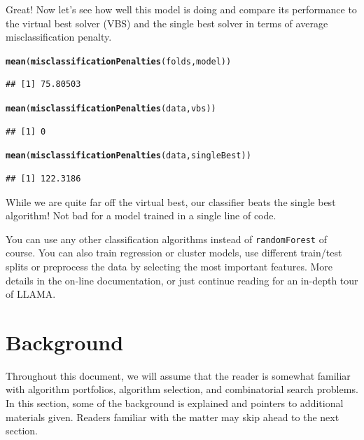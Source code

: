 \documentclass{article}\usepackage[]{graphicx}\usepackage[]{color}
\makeatletter
\newcommand{\hlstd}[1]{\textcolor[rgb]{0.345,0.345,0.345}{#1}}%
\newcommand{\hlkwd}[1]{\textcolor[rgb]{0.737,0.353,0.396}{\textbf{#1}}}%
\newenvironment{kframe}{%
 \def\at@end@of@kframe{}%
 \ifinner\ifhmode%
  \def\at@end@of@kframe{\end{minipage}}%
  \begin{minipage}{\columnwidth}%
 \fi\fi%
 \def\FrameCommand##1{\hskip\@totalleftmargin \hskip-\fboxsep
 \colorbox{shadecolor}{##1}\hskip-\fboxsep
     \hskip-\linewidth \hskip-\@totalleftmargin \hskip\columnwidth}%
 \MakeFramed {\advance\hsize-\width
   \@totalleftmargin\z@ \linewidth\hsize
   \@setminipage}}%
 {\par\unskip\endMakeFramed%
 \at@end@of@kframe}
\newenvironment{knitrout}{}{} %
\makeatother
\begin{document}
Great! Now let's see how well this model is doing and compare its performance to
the virtual best solver (VBS) and the single best solver in terms of average
misclassification penalty.

\begin{knitrout}
\color{fgcolor}\begin{kframe}
\begin{alltt}
\hlkwd{mean}\hlstd{(}\hlkwd{misclassificationPenalties}\hlstd{(folds, model))}
\end{alltt}
\begin{verbatim}
## [1] 75.80503
\end{verbatim}
\begin{alltt}
\hlkwd{mean}\hlstd{(}\hlkwd{misclassificationPenalties}\hlstd{(data, vbs))}
\end{alltt}
\begin{verbatim}
## [1] 0
\end{verbatim}
\begin{alltt}
\hlkwd{mean}\hlstd{(}\hlkwd{misclassificationPenalties}\hlstd{(data, singleBest))}
\end{alltt}
\begin{verbatim}
## [1] 122.3186
\end{verbatim}
\end{kframe}
\end{knitrout}

While we are quite far off the virtual best, our classifier beats the single
best algorithm! Not bad for a model trained in a single line of code.

You can use any other classification algorithms instead of
\lstinline{randomForest} of course. You can also train regression or cluster
models, use different train/test splits or preprocess the data by selecting the
most important features. More details in the on-line documentation, or just
continue reading for an in-depth tour of LLAMA.

\clearpage

\tableofcontents

\clearpage

\section{Background}

Throughout this document, we will assume that the reader is somewhat familiar
with algorithm portfolios, algorithm selection, and combinatorial search
problems. In this section, some of the background is explained and pointers to
additional materials given. Readers familiar with the matter may skip ahead to
the next section.
\end{document}
